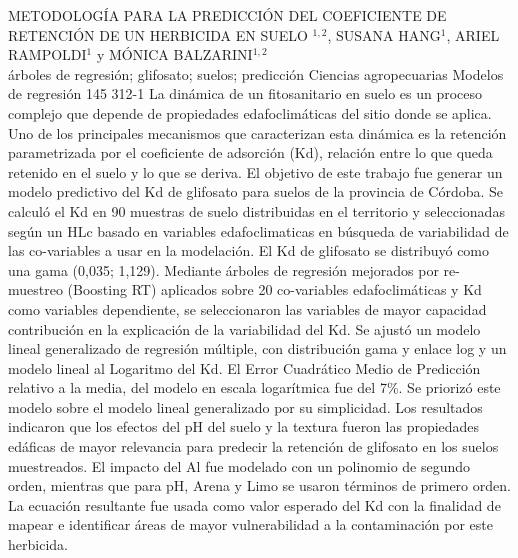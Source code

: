 \A
{METODOLOGÍA PARA LA PREDICCIÓN DEL COEFICIENTE DE RETENCIÓN DE UN HERBICIDA EN SUELO}
{$^{1,2}$, SUSANA HANG$^1$, ARIEL RAMPOLDI$^1$ y MÓNICA BALZARINI$^{1,2}$}
{
\\}
{árboles de regresión; glifosato; suelos; predicción} 
 {Ciencias agropecuarias} 
 {Modelos de regresión} 
 {145} 
 {312-1}
{La dinámica de un fitosanitario en suelo es un proceso complejo que depende de propiedades edafoclimáticas del sitio donde se aplica. Uno de los principales mecanismos que caracterizan esta dinámica es la retención parametrizada por el coeficiente de adsorción (Kd), relación entre lo que queda retenido en el suelo y lo que se deriva. El objetivo de este trabajo fue generar un modelo predictivo del Kd de glifosato para suelos de la provincia de Córdoba. Se calculó el Kd en 90 muestras de suelo distribuidas en el territorio y seleccionadas según un HLc basado en variables edafoclimaticas en búsqueda de variabilidad de las co-variables a usar en la modelación. El Kd de glifosato se distribuyó como una gama (0,035; 1,129). Mediante árboles de regresión mejorados por re-muestreo (Boosting RT) aplicados sobre 20 co-variables edafoclimáticas y Kd como variables dependiente, se seleccionaron las variables de mayor capacidad contribución en la explicación de la variabilidad del Kd. Se ajustó un modelo lineal generalizado de regresión múltiple, con distribución gama y enlace log y un modelo lineal al Logaritmo del Kd. El Error Cuadrático Medio de Predicción relativo a la media, del modelo en escala logarítmica fue del 7\%. Se priorizó este modelo sobre el modelo lineal generalizado por su simplicidad. Los resultados indicaron que los efectos del pH del suelo y la textura fueron las propiedades edáficas de mayor relevancia para predecir la retención de glifosato en los suelos muestreados. El impacto del Al fue modelado con un polinomio de segundo orden, mientras que para pH, Arena y Limo se usaron términos de primero orden. La ecuación resultante fue usada como valor esperado del Kd con la finalidad de mapear e identificar áreas de mayor vulnerabilidad a la contaminación por este herbicida.}
